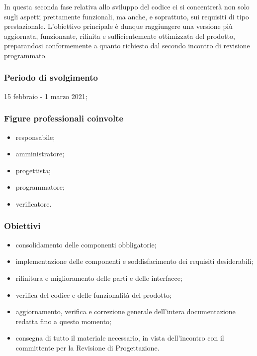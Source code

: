 In questa seconda fase relativa allo sviluppo del codice ci si concentrerà non solo sugli aspetti prettamente funzionali, ma anche, e soprattuto, sui requisiti di tipo prestazionale. L'obiettivo principale è dunque raggiungere una versione più aggiornata, funzionante, rifinita e sufficientemente ottimizzata del prodotto, preparandosi conformemente a quanto richiesto dal secondo incontro di revisione programmato.
        
        \subsubsection{Periodo di svolgimento}
        15 febbraio - 1 marzo 2021;
        
        \subsubsection{Figure professionali coinvolte}
            \begin{itemize}
                \item responsabile;
                \item amministratore;
                \item progettista;
                \item programmatore;
                \item verificatore.
            \end{itemize}

        \subsubsection{Obiettivi}
        \begin{itemize}
            \item consolidamento delle componenti obbligatorie;
            \item implementazione delle componenti e soddisfacimento dei requisiti desiderabili;
            \item rifinitura e miglioramento delle parti e delle interfacce;
            \item verifica del codice e delle funzionalità del prodotto;
            \item aggiornamento, verifica e correzione generale dell'intera documentazione redatta fino a questo momento;
            \item consegna di tutto il materiale necessario, in vista dell'incontro con il committente per la Revisione di Progettazione.
        \end{itemize}